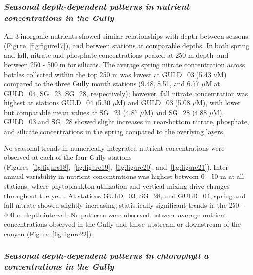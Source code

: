 \documentclass[12pt]{article}\usepackage[]{graphicx}\usepackage[]{color}
\begin{document}
\hypertarget{seasonal-depth-dependent-patterns-in-nutrient-concentrations-in-the-gully}{%
\subsubsection{\texorpdfstring{\emph{Seasonal depth-dependent patterns in nutrient concentrations in the Gully}}{Seasonal depth-dependent patterns in nutrient concentrations in the Gully}}\label{seasonal-depth-dependent-patterns-in-nutrient-concentrations-in-the-gully}}

All 3 inorganic nutrients showed similar relationships with depth between seasons (Figure~\ref{fig:figure17}), and between stations at comparable depths. In both spring and fall, nitrate and phosphate concentrations peaked at 250 m depth, and between 250 - 500 m for silicate. The average spring nitrate concentration across bottles collected within the top 250 m was lowest at GULD\_03 (5.43 \(\mu\)M) compared to the three Gully mouth stations (9.48, 8.51, and 6.77 \(\mu\)M at GULD\_04, SG\_23, SG\_28, respectively); however, fall nitrate concentration was highest at stations GULD\_04 (5.30 \(\mu\)M) and GULD\_03 (5.08 \(\mu\)M), with lower but comparable mean values at SG\_23 (4.87 \(\mu\)M) and SG\_28 (4.88 \(\mu\)M). GULD\_03 and SG\_28 showed slight increases in near-bottom nitrate, phosphate, and silicate concentrations in the spring compared to the overlying layers.

No seasonal trends in numerically-integrated nutrient concentrations were observed at each of the four Gully stations (Figures~\ref{fig:figure18},~\ref{fig:figure19},~\ref{fig:figure20}, and~\ref{fig:figure21}). Inter-annual variability in nutrient concentrations was highest between 0 - 50 m at all stations, where phytoplankton utilization and vertical mixing drive changes throughout the year. At stations GULD\_03, SG\_28, and GULD\_04, spring and fall nitrate showed slightly increasing, statistically-significant trends in the 250 - 400 m depth interval. No patterns were observed between average nutrient concentrations observed in the Gully and those upstream or downstream of the canyon (Figure~\ref{fig:figure22}).

\hypertarget{seasonal-depth-dependent-patterns-in-chlorophyll-a-concentrations-in-the-gully}{%
\subsubsection{\texorpdfstring{\emph{Seasonal depth-dependent patterns in chlorophyll a concentrations in the Gully}}{Seasonal depth-dependent patterns in chlorophyll a concentrations in the Gully}}\label{seasonal-depth-dependent-patterns-in-chlorophyll-a-concentrations-in-the-gully}}
\end{document}
